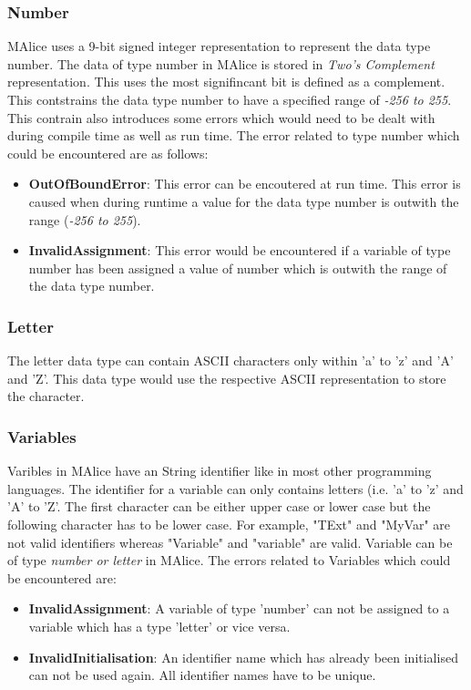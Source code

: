 \documentclass[a4wide, 11pt]{article}
\begin{document}
		\subsubsection{Number}
			\label{sec:num}
			MAlice uses a 9-bit signed integer representation to represent the data type number. The data of type
			number in MAlice is stored in \emph{Two's Complement} representation. This uses the most signifincant
			bit is defined as a complement. 
			This contstrains the data type number to have a specified range of \emph{-256 to 255}. This
			contrain also introduces some errors which would need to be dealt with during compile time as
			well as run time. The error related to type number which could be encountered are as follows:
			\begin{itemize}
				\item {\bf OutOfBoundError}: This error can be encoutered at run time. 
							This error is caused when during
							runtime a value for the data type number is outwith the range (\emph{-256 to 255}).
				\item {\bf InvalidAssignment}: This error would be encountered if a 
							variable of type number has been assigned a value of number which is 
							outwith the range of the data type number. 
			\end{itemize}
	
	\subsubsection{Letter}
		\label{sec:letter}
			The letter data type can contain ASCII characters only within 'a' to 'z' and 'A' and 'Z'.
			This data type would use the respective ASCII representation to store the character.

	\subsubsection{Variables}
		\label{sec:var}
			Varibles in MAlice have an String identifier like in most other programming languages.
			The identifier for a variable can only contains letters (i.e. 'a' to 'z' and 'A' to 'Z'.
			The first character can be either upper case or lower case but the following character has to be
			lower case. For example, "TExt" and "MyVar" are not valid identifiers whereas "Variable" and
			"variable" are valid. Variable can be of type 
			\emph{number or letter} in MAlice. The errors related to Variables which could be encountered are:
			\begin{itemize}
				\item {\bf InvalidAssignment}: A variable of type 'number' can not be assigned to a variable which
					has a type 'letter' or vice versa.
				\item {\bf InvalidInitialisation}: An identifier name which has already been initialised can not
					be used again. All identifier names have to be unique.
			\end{itemize}
	
\end{document}
